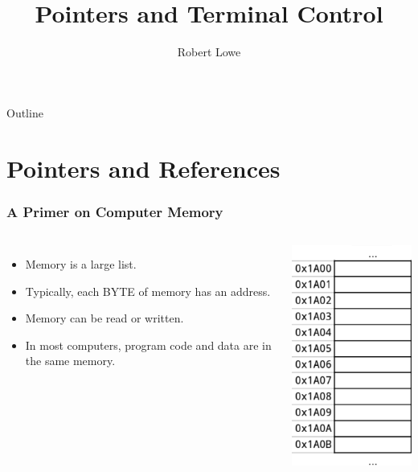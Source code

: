 \documentclass{beamer}
\title{Pointers and Terminal Control}
\author{Robert Lowe\\}
\institute[Maryville College] %
{
  Division of Mathematics and Computer Science\\
  Maryville College
}
\date[]{}
\begin{document}
\begin{frame}
  \titlepage
\end{frame}

\begin{frame}{Outline}
  \tableofcontents
\end{frame}





\section{Pointers and References}
\begin{frame}
    \frametitle{A Primer on Computer Memory}
    \begin{columns}
        \begin{itemize}
            \item Memory is a large list.
            \item Typically, each BYTE of memory has an address.
            \item Memory can be read or written.
            \item In most computers, program code and data are in the same memory.
        \end{itemize}
        \includegraphics[height=0.75\textheight]{images/memlist}
    \end{columns}
\end{frame}
\end{document}
